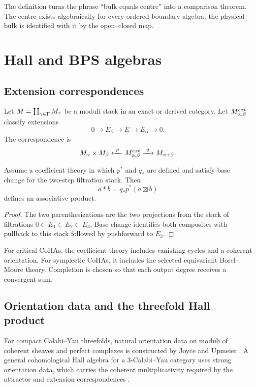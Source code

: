 The definition turns the phrase ``bulk equals centre'' into a comparison theorem. The centre exists algebraically for every ordered boundary algebra; the physical bulk is identified with it by the open--closed map.

\part{Hall and BPS algebras}

\chapter{Extension correspondences}
Let $M=\coprod_{\gamma\in\Gamma}M_\gamma$ be a moduli stack in an exact or derived category. Let $M^{ext}_{\alpha,\beta}$ classify extensions
\[
 0\longrightarrow E_\beta\longrightarrow E\longrightarrow E_\alpha\longrightarrow0.
\]
The correspondence is
\[
 M_\alpha\times M_\beta
 \xleftarrow{\ p\ }
 M^{ext}_{\alpha,\beta}
 \xrightarrow{\ q\ }
 M_{\alpha+\beta}.
\]

\begin{theorem}
Assume a coefficient theory in which $p^*$ and $q_*$ are defined and satisfy base change for the two-step filtration stack. Then
\[
 a*b=q_*p^*(a\boxtimes b)
\]
defines an associative product.
\end{theorem}
\begin{proof}
The two parenthesizations are the two projections from the stack of filtrations $0\subset E_1\subset E_2\subset E_3$. Base change identifies both composites with pullback to this stack followed by pushforward to $E_3$.
\end{proof}

For critical CoHAs, the coefficient theory includes vanishing cycles and a coherent orientation. For symplectic CoHAs, it includes the selected equivariant Borel--Moore theory. Completion is chosen so that each output degree receives a convergent sum.

\chapter{Orientation data and the threefold Hall product}
For compact Calabi--Yau threefolds, natural orientation data on moduli of coherent sheaves and perfect complexes is constructed by Joyce and Upmeier \cite{JoyceUpmeier}.  A general cohomological Hall algebra for a $3$-Calabi--Yau category uses strong orientation data, which carries the coherent multiplicativity required by the attractor and extension correspondences \cite{KPS}.

